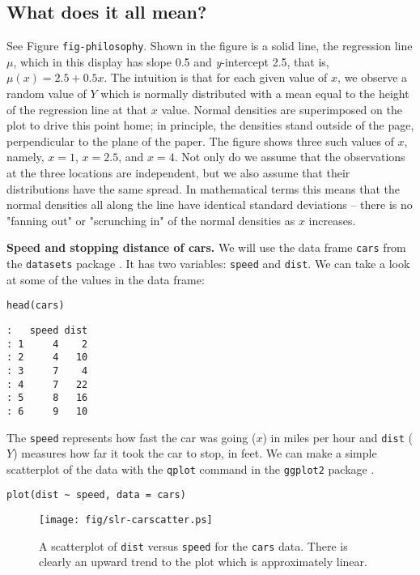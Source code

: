 \subsection{What does it all mean?}
\label{sec-11-1-1}
See Figure \texttt{fig-philosophy}. Shown in the figure is a solid line, the
regression line  \(\mu\), which in
this display has slope 0.5 and \emph{y}-intercept 2.5, that is, \( \mu(x) =
2.5 + 0.5x \). The intuition is that for each given value of \(x\), we
observe a random value of \(Y\) which is normally distributed with a
mean equal to the height of the regression line at that \(x\)
value. Normal densities are superimposed on the plot to drive this
point home; in principle, the densities stand outside of the page,
perpendicular to the plane of the paper. The figure shows three such
values of \(x\), namely, \( x = 1 \), \( x = 2.5 \), and \( x = 4
\). Not only do we assume that the observations at the three locations
are independent, but we also assume that their distributions have the
same spread. In mathematical terms this means that the normal
densities all along the line have identical standard deviations --
there is no "fanning out" or "scrunching in" of the normal densities
as \(x\) increases.

\label{exa-Speed-and-Stopping} \textbf{Speed and stopping distance of cars.} We
will use the data frame \texttt{cars}  from the \texttt{datasets} package
\cite{datasets}. It has two variables: \texttt{speed} and \texttt{dist}. We can take
a look at some of the values in the data frame:
\begin{verbatim}
head(cars)
\end{verbatim}

\begin{verbatim}
:   speed dist
: 1     4    2
: 2     4   10
: 3     7    4
: 4     7   22
: 5     8   16
: 6     9   10
\end{verbatim}

The \texttt{speed} represents how fast the car was going (\(x\)) in miles per
hour and \texttt{dist} (\(Y\)) measures how far it took the car to stop, in
feet. We can make a simple scatterplot of the data with the \texttt{qplot}
command in the \texttt{ggplot2} package \cite{ggplot2}.

\begin{verbatim}
plot(dist ~ speed, data = cars)
\end{verbatim}

\begin{figure}[ht!]
\centering
\texttt{[image: fig/slr-carscatter.ps]}
\caption[Scatterplot of \texttt{dist} versus \texttt{speed} for the \texttt{cars} data]{\label{fig-carscatter}\small A scatterplot of \texttt{dist} versus \texttt{speed} for the \texttt{cars} data.  There is clearly an upward trend to the plot which is approximately linear.}
\end{figure}


